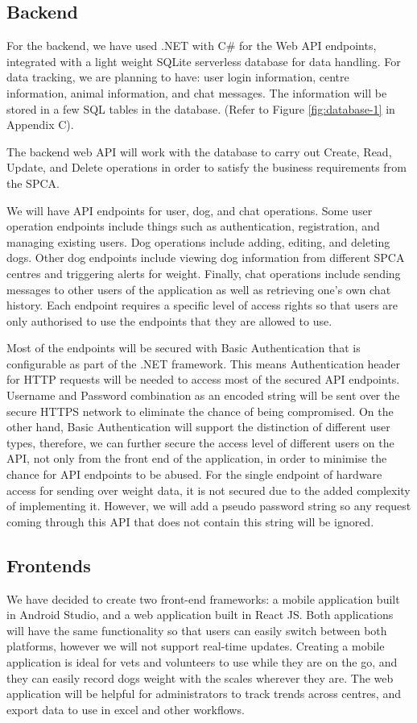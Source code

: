 \subsection{Backend}

For the backend, we have used .NET with C\# for the Web API endpoints, integrated with a light weight SQLite serverless database for data handling. For data tracking, we are planning to have: user login information, centre information, animal information, and chat messages. The information will be stored in a few SQL tables in the database. (Refer to Figure \ref{fig:database-1} in Appendix C).

The backend web API will work with the database to carry out Create, Read, Update, and Delete operations in order to satisfy the business requirements from the SPCA.

We will have API endpoints for user, dog, and chat operations. Some user operation endpoints include things such as authentication, registration, and managing existing users. Dog operations include adding, editing, and deleting dogs. Other dog endpoints include viewing dog information from different SPCA centres and triggering alerts for weight. Finally, chat operations include sending messages to other users of the application as well as retrieving one’s own chat history. Each endpoint requires a specific level of access rights so that users are only authorised to use the endpoints that they are allowed to use.

Most of the endpoints will be secured with Basic Authentication that is configurable as part of the .NET framework. This means Authentication header for HTTP requests will be needed to access most of the secured API endpoints. Username and Password combination as an encoded string will be sent over the secure HTTPS network to eliminate the chance of being compromised. On the other hand, Basic Authentication will support the distinction of different user types, therefore, we can further secure the access level of different users on the API, not only from the front end of the application, in order to minimise the chance for API endpoints to be abused. For the single endpoint of hardware access for sending over weight data, it is not secured due to the added complexity of implementing it. However, we will add a pseudo password string so any request coming through this API that does not contain this string will be ignored.


\subsection{Frontends}
We have decided to create two front-end frameworks: a mobile application built in Android Studio, and a web application built in React JS. Both applications will have the same functionality so that users can easily switch between both platforms, however we will not support real-time updates. Creating a mobile application is ideal for vets and volunteers to use while they are on the go, and they can easily record dogs weight with the scales wherever they are. The web application will be helpful for administrators to track trends across centres, and export data to use in excel and other workflows. 

